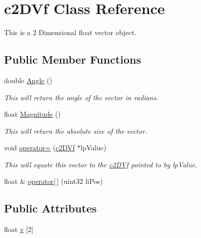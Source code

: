 \hypertarget{classc2_d_vf}{
\section{c2DVf Class Reference}
\label{classc2_d_vf}
}


This is a 2 Dimensional float vector object.  


\subsection*{Public Member Functions}
\begin{DoxyCompactItemize}
\item 
double \hyperlink{classc2_d_vf_af27fa9c4e23dc40f387de099d95c20e6}{Angle} ()
\begin{DoxyCompactList}\small\item\em This will return the angle of the vector in radians. \item\end{DoxyCompactList}\item 
float \hyperlink{classc2_d_vf_a86cc6b98f659391c7d7f9ca3b4fa67b0}{Magnitude} ()
\begin{DoxyCompactList}\small\item\em This will return the absolute size of the vector. \item\end{DoxyCompactList}\item 
void \hyperlink{classc2_d_vf_ad3ad8262ba3a4a079459a9830ef13dd0}{operator=} (\hyperlink{classc2_d_vf}{c2DVf} $\ast$lpValue)
\begin{DoxyCompactList}\small\item\em This will equate this vector to the \hyperlink{classc2_d_vf}{c2DVf} pointed to by lpValue. \item\end{DoxyCompactList}\item 
float \& \hyperlink{classc2_d_vf_a8599a850a1a8df8ed3d0838615eaef0a}{operator\mbox{[}$\,$\mbox{]}} (uint32 liPos)
\end{DoxyCompactItemize}
\subsection*{Public Attributes}
\begin{DoxyCompactItemize}
\item 
float \hyperlink{classc2_d_vf_a71dd2a5098df62f0522273689699663e}{v} \mbox{[}2\mbox{]}
\end{DoxyCompactItemize}


